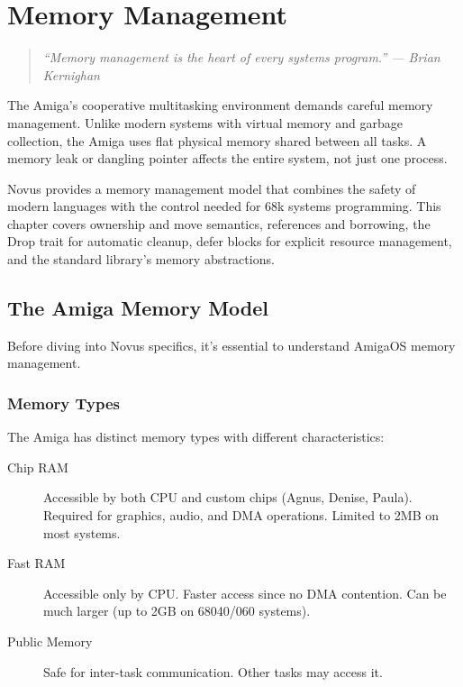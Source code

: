 \chapter{Memory Management}
\label{ch:memory}

\begin{quote}
\textit{``Memory management is the heart of every systems program.'' --- Brian Kernighan}
\end{quote}

The Amiga's cooperative multitasking environment demands careful memory management. Unlike modern systems with virtual memory and garbage collection, the Amiga uses flat physical memory shared between all tasks. A memory leak or dangling pointer affects the entire system, not just one process.

Novus provides a memory management model that combines the safety of modern languages with the control needed for 68k systems programming. This chapter covers ownership and move semantics, references and borrowing, the Drop trait for automatic cleanup, defer blocks for explicit resource management, and the standard library's memory abstractions.

\section{The Amiga Memory Model}

Before diving into Novus specifics, it's essential to understand AmigaOS memory management.

\subsection{Memory Types}

The Amiga has distinct memory types with different characteristics:

\begin{description}
    \item[Chip RAM] Accessible by both CPU and custom chips (Agnus, Denise, Paula). Required for graphics, audio, and DMA operations. Limited to 2MB on most systems.

    \item[Fast RAM] Accessible only by CPU. Faster access since no DMA contention. Can be much larger (up to 2GB on 68040/060 systems).

    \item[Public Memory] Safe for inter-task communication. Other tasks may access it.
\end{description}

